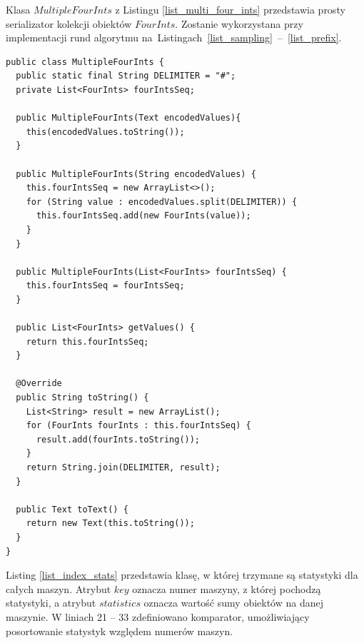 \documentclass[magisterska]{pracamgr}
\begin{document}
\newpage 
Klasa \(MultipleFourInts\) z Listingu \ref{list_multi_four_ints} przedstawia prosty serializator kolekcji obiektów \(FourInts\). Zostanie wykorzystana przy implementacji rund algorytmu \mbox{na Listingach \ref{list_sampling} -- \ref{list_prefix}}.

\begin{lstlisting}[language=SmallJava,firstnumber=1,label=list_multi_four_ints,caption=Kolekcja obiektów FourInts]
public class MultipleFourInts {
  public static final String DELIMITER = "#";
  private List<FourInts> fourIntsSeq;

  public MultipleFourInts(Text encodedValues){
    this(encodedValues.toString());
  }

  public MultipleFourInts(String encodedValues) {
    this.fourIntsSeq = new ArrayList<>();
    for (String value : encodedValues.split(DELIMITER)) {
      this.fourIntsSeq.add(new FourInts(value));
    }
  }

  public MultipleFourInts(List<FourInts> fourIntsSeq) {
    this.fourIntsSeq = fourIntsSeq;
  }

  public List<FourInts> getValues() {
    return this.fourIntsSeq;
  }

  @Override
  public String toString() {
    List<String> result = new ArrayList();
    for (FourInts fourInts : this.fourIntsSeq) {
      result.add(fourInts.toString());
    }
    return String.join(DELIMITER, result);
  }

  public Text toText() {
    return new Text(this.toString());
  }
}
\end{lstlisting}

\newpage
Listing \ref{list_index_stats} przedstawia klasę, w której trzymane są statystyki dla całych maszyn. Atrybut \(key\) oznacza numer maszyny, z której pochodzą statystyki, a atrybut \(statistics\) oznacza wartość sumy obiektów na danej maszynie. W liniach 21 -- 33 zdefiniowano komparator, umożliwiający posortowanie statystyk względem numerów maszyn.
\end{document}
